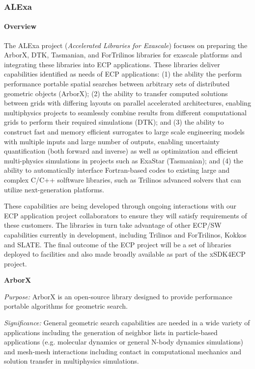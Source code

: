 \subsubsection{ ALExa}


\paragraph{Overview}

The ALExa project ({\sl Accelerated Libraries for Exascale}) focuses on
preparing the ArborX, DTK, Tasmanian, and ForTrilinos libraries for exascale
platforms and integrating these libraries into ECP applications.
These libraries deliver capabilities identified as needs of ECP applications:
%
(1) the ability the perform performance portable spatial searches between
arbitrary sets of distributed geometric objects (ArborX);
%
(2) the ability to transfer computed
solutions between grids with differing layouts on parallel accelerated
architectures, enabling multiphysics projects to seamlessly combine results
from different computational grids to perform their required simulations
(DTK); and
%
(3) the ability to construct fast and memory efficient surrogates to large
scale engineering models with multiple inputs and large number of outputs,
enabling uncertainty quantification (both forward and inverse) as well as
optimization and efficient multi-physics simulations in projects such as
ExaStar (Tasmanian); and
%
(4) the ability to automatically interface Fortran-based codes to existing
large and complex C/C++ solftware libraries, such as Trilinos advanced solvers
that can utilize next-generation platforms.


These capabilities are being developed through ongoing interactions with our
ECP application project collaborators to ensure they will satisfy requirements
of these customers.  The libraries in turn take advantage of other ECP/SW
capabilities currently in development, including Trilinos and ForTrilinos,
Kokkos and SLATE.  The final outcome of the ECP project will be a set of
libraries deployed to facilities and also made broadly available as part of
the xSDK4ECP project.


{\bf ArborX}

{\it Purpose:} ArborX is an open-source library designed to provide
performance portable algorithms for geometric search.

{\it Significance:} General geometric search capabilities are needed in a wide
variety of applications including the generation of neighbor lists in
particle-based applications (e.g. molecular dynamics or general N-body
dynamics simulations) and mesh-mesh interactions including contact in
computational mechanics and solution transfer in multiphysics simulations.

